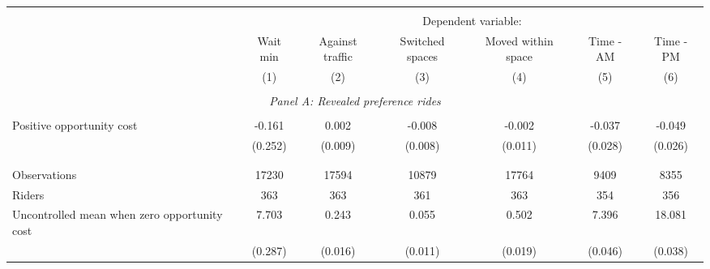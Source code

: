 \begin{tabular}{l*{6}{c}} \hline\hline \\[-1.8ex] & \multicolumn{6}{c}{Dependent variable: } \\ 
                    &\multicolumn{1}{c}{Wait min}&\multicolumn{1}{c}{Against traffic}&\multicolumn{1}{c}{Switched spaces}&\multicolumn{1}{c}{Moved within space}&\multicolumn{1}{c}{Time - AM}&\multicolumn{1}{c}{Time - PM}\\
& (1) & (2)  & (3) & (4) & (5) & (6) \\ \hline \\[-1ex] \multicolumn{7}{c}{\textit{Panel A: Revealed preference rides}} \\\\[-1ex]
Positive opportunity cost&      -0.161         &       0.002         &      -0.008         &      -0.002         &      -0.037         &      -0.049\sym{*}  \\
                    &     (0.252)         &     (0.009)         &     (0.008)         &     (0.011)         &     (0.028)         &     (0.026)         \\
\\[-1.8ex] \hline \\[-1.8ex]  
Observations        &       17230         &       17594         &       10879         &       17764         &        9409         &        8355         \\
Riders              &         363         &         363         &         361         &         363         &         354         &         356         \\
Uncontrolled mean when zero opportunity cost&       7.703         &       0.243         &       0.055         &       0.502         &       7.396         &      18.081         \\
\,                  &     (0.287)         &     (0.016)         &     (0.011)         &     (0.019)         &     (0.046)         &     (0.038)         \\


\end{tabular}
